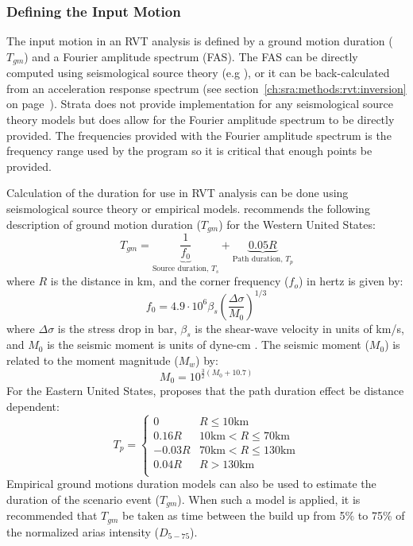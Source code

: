 \documentclass[12pt,oneside]{book}
\begin{document}
\subsubsection{Defining the Input Motion}
The input motion in an RVT analysis is defined by a ground motion duration ($T_{gm}$) and a Fourier
amplitude spectrum (FAS).  The FAS can be directly computed using seismological source theory (e.g
\citep[e.g.][]{brune:70,brune:71}), or it can be back-calculated from an acceleration response
spectrum (see section~\ref{ch:sra:methods:rvt:inversion} on
page~\pageref{ch:sra:methods:rvt:inversion}).  Strata does not provide implementation for
any seismological source theory models but does allow for the Fourier amplitude spectrum to be
directly provided.  The frequencies provided with the Fourier amplitude spectrum is the frequency
range used by the program so it is critical that enough points be provided.

Calculation of the duration for use in RVT analysis can be done using seismological source theory or
empirical models.  \citet{boore:03} recommends the following description of ground motion duration
($T_{gm}$) for the Western United States:
\begin{equation}
    T_{gm} =  \underbrace{\frac{1}{f_0}}_\text{Source duration, $T_s$} + \underbrace{0.05
    R}_\text{Path duration, $T_p$}
\end{equation}
where $R$ is the distance in km, and the corner frequency ($f_o$) in hertz is given by:
\begin{displaymath}
    f_0 = 4.9 \cdot 10^6 \beta_s \left( \frac{\Delta\sigma}{M_0} \right)^{1/3}
\end{displaymath}
where $\Delta\sigma$ is the stress drop in bar, $\beta_s$ is the shear-wave velocity in units of
km/s, and $M_0$ is the seismic moment is units of dyne-cm \citep{brune:70,brune:71}.  The seismic
moment ($M_0$) is related to the moment magnitude ($M_w$) by:
\begin{displaymath}
    M_0 = 10^{\frac{3}{2}\left( M_0 + 10.7 \right)}
\end{displaymath}
For the Eastern United States, \citet{campbell:03} proposes that the path duration effect be
distance dependent:
\begin{equation}
    T_p = \left\{
        \begin{array}{ll}
            0 & R \le 10 \text{km} \\
            0.16R & 10 \text{km} < R \le 70 \text{km} \\
            -0.03R & 70 \text{km} < R \le 130 \text{km} \\
            0.04R & R > 130 \text{km} \\
        \end{array}
    \right.
\end{equation}
Empirical ground motions duration models \citep[e.g.][]{abrahamson:96} can also be used to estimate the duration of the scenario
event ($T_{gm}$).  When such a model is applied, it is recommended that $T_{gm}$ be taken as time
between the build up from 5\% to 75\% of the normalized arias intensity ($D_{5-75}$).
\end{document}
